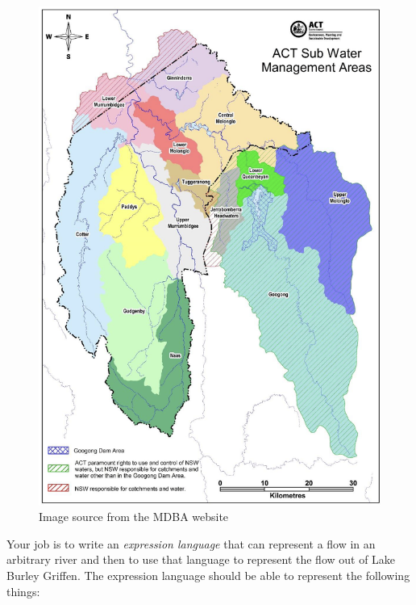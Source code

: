 \documentclass[twoside=false, DIV=14]{scrartcl}
\begin{document}
\begin{figure}
\includegraphics[width=\textwidth]{act_waterways.png}
\caption{Image source from the MDBA website}
\label{fig:act_waterways}
\end{figure}

Your job is to write an \emph{expression language} that can represent a flow in an arbitrary river and then to use that language to represent the flow out of Lake Burley Griffen.  The expression language should be able to represent the following things:
\end{document}
